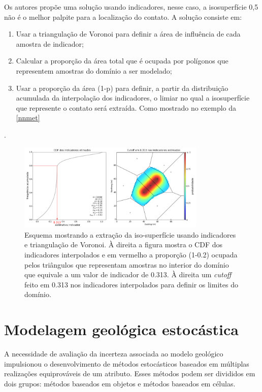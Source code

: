 Os autores propõe uma solução usando indicadores, nesse caso, a isosuperfície 0,5 não é o melhor palpite para a localização do contato. A solução consiste em:

\begin{enumerate}[label=\roman*]
    \item Usar a triangulação de Voronoi para definir a área de influência de cada amostra de indicador;
    \item Calcular a proporção da área total que é ocupada por polígonos que representem amostras do domínio a ser modelado;
    \item Usar a proporção da área (1-p) para definir, a partir da distribuição acumulada da interpolação dos indicadores, o limiar no qual a isosuperfície que represente o contato será extraída. Como mostrado no exemplo da \autoref{nnmet} 
\end{enumerate}.

\begin{figure}[H]
\caption{\label{nnmet} Esquema mostrando a extração da iso-superfície usando indicadores e triangulação de Voronoi. À direita a figura mostra o CDF dos indicadores interpolados e em vermelho a proporção (1-0.2) ocupada pelos triângulos que representam amostras no interior do domínio que equivale a um valor de indicador de 0.313. À direita um \textit{cutoff} feito em 0.313 nos indicadores interpolados para definir os limites do domínio.}
	\centering
		\includegraphics[width=0.8\textwidth]{capitulo_2/imagens/nnmet.png}
\end{figure}

\section{Modelagem geológica estocástica}

A necessidade de avaliação da incerteza associada ao modelo geológico impulsionou o desenvolvimento de métodos estocásticos baseados em múltiplas realizações equiprováveis de um atributo. Esses métodos podem ser divididos em dois grupos: métodos baseados em objetos e métodos baseados em células. 

